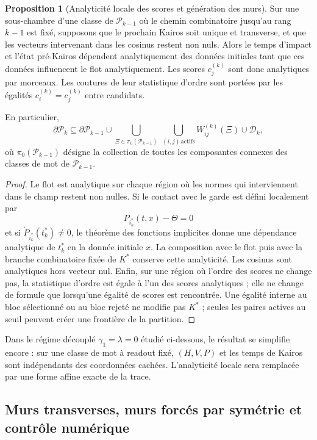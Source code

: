 \documentclass[11pt,a4paper]{article}
\theoremstyle{definition}
\newtheorem{propositionthm}[definition]{Proposition}
\theoremstyle{remark}
\begin{document}
\begin{propositionthm}[Analyticité locale des scores et génération des murs]
Sur une sous-chambre d'une classe de $\mathcal P_{k-1}$ où le chemin combinatoire jusqu'au rang $k-1$ est fixé, supposons que le prochain Kairos soit unique et transverse, et que les vecteurs intervenant dans les cosinus restent non nuls. Alors le temps d'impact et l'état pré-Kairos dépendent analytiquement des données initiales tant que ces données influencent le flot analytiquement. Les scores $c_j^{(k)}$ sont donc analytiques par morceaux. Les coutures de leur statistique d'ordre sont portées par les égalités $c_i^{(k)}=c_j^{(k)}$ entre candidats.

En particulier,
\[
 \partial\mathcal P_k
 \subseteq
 \partial\mathcal P_{k-1}
 \cup
 \bigcup_{\Xi\in\pi_0(\mathcal P_{k-1})}
 \ \bigcup_{(i,j)\,\mathrm{actifs}}
 W_{ij}^{(k)}(\Xi)
 \cup
 \mathcal D_k,
\]
où $\pi_0(\mathcal P_{k-1})$ désigne la collection de toutes les composantes connexes des classes de mot de $\mathcal P_{k-1}$.
\end{propositionthm}

\begin{proof}
Le flot est analytique sur chaque région où les normes qui interviennent dans le champ restent non nulles. Si le contact avec le garde est défini localement par
\[
 P_{i_k^*}(t,x)-\Theta=0
\]
et si $\dot P_{i_k^*}(t_k^*)\neq0$, le théorème des fonctions implicites donne une dépendance analytique de $t_k^*$ en la donnée initiale $x$. La composition avec le flot puis avec la branche combinatoire fixée de $K^*$ conserve cette analyticité. Les cosinus sont analytiques hors vecteur nul. Enfin, sur une région où l'ordre des scores ne change pas, la statistique d'ordre est égale à l'un des scores analytiques ; elle ne change de formule que lorsqu'une égalité de scores est rencontrée. Une égalité interne au bloc sélectionné ou au bloc rejeté ne modifie pas $K^*$ ; seules les paires actives au seuil peuvent créer une frontière de la partition.
\end{proof}

Dans le régime découplé $\gamma_1=\lambda=0$ étudié ci-dessous, le résultat se simplifie encore : sur une classe de mot à readout fixé, $(H,V,P)$ et les temps de Kairos sont indépendants des coordonnées cachées. L'analyticité locale sera remplacée par une forme affine exacte de la trace.

\subsection{Murs transverses, murs forcés par symétrie et contrôle numérique}
\end{document}

